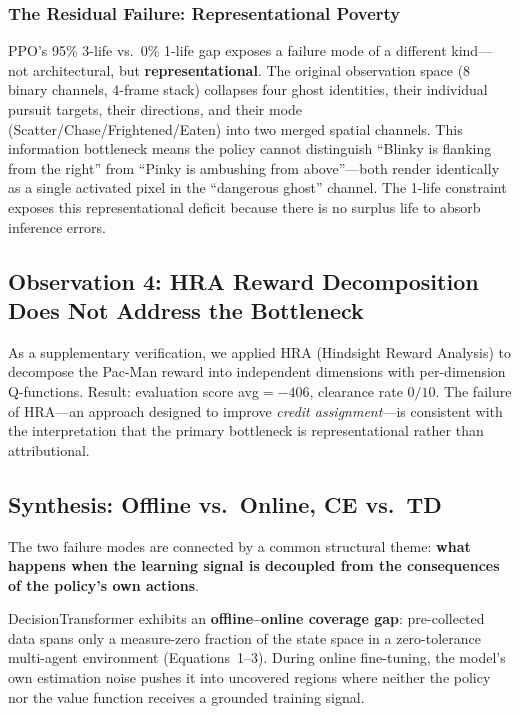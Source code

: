 \documentclass[11pt,a4paper]{article}
\theoremstyle{definition}
\begin{document}
\subsubsection{The Residual Failure: Representational Poverty}

PPO's 95\% 3-life vs.\ 0\% 1-life gap exposes a failure mode of a different kind---not architectural, but \textbf{representational}.
The original observation space (8 binary channels, 4-frame stack) collapses four ghost identities, their individual pursuit targets, their directions, and their mode (Scatter/Chase/Frightened/Eaten) into two merged spatial channels.
This information bottleneck means the policy cannot distinguish ``Blinky is flanking from the right'' from ``Pinky is ambushing from above''---both render identically as a single activated pixel in the ``dangerous ghost'' channel.
The 1-life constraint exposes this representational deficit because there is no surplus life to absorb inference errors.

\subsection{Observation 4: HRA Reward Decomposition Does Not Address the Bottleneck}

As a supplementary verification, we applied HRA (Hindsight Reward Analysis) to decompose the Pac-Man reward into independent dimensions with per-dimension Q-functions.
Result: evaluation score avg$=-406$, clearance rate $0/10$.
The failure of HRA---an approach designed to improve \textit{credit assignment}---is consistent with the interpretation that the primary bottleneck is representational rather than attributional.
\subsection{Synthesis: Offline vs.\ Online, CE vs.\ TD}

The two failure modes are connected by a common structural theme: \textbf{what happens when the learning signal is decoupled from the consequences of the policy's own actions}.

DecisionTransformer exhibits an \textbf{offline--online coverage gap}: pre-collected data spans only a measure-zero fraction of the state space in a zero-tolerance multi-agent environment (Equations~1--3). During online fine-tuning, the model's own estimation noise pushes it into uncovered regions where neither the policy nor the value function receives a grounded training signal.
\end{document}
